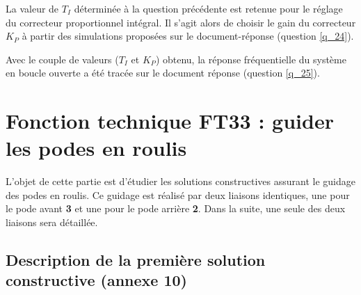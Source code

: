 \ifprof
\begin{corrige}
\end{corrige}
\else
\fi


La valeur de $T_I$ déterminée à la question précédente est retenue pour le réglage du correcteur proportionnel intégral. Il s’agit alors de choisir le gain du correcteur $K_P$ à partir des simulations proposées sur le document-réponse (question \ref{q_24}).

\ifprof
\begin{corrige}
\end{corrige}
\else
\fi


Avec le couple de valeurs ($T_I$ et $K_P$) obtenu, la réponse fréquentielle du système en boucle ouverte a été tracée sur le document réponse (question \ref{q_25}).

\ifprof
\begin{corrige}
\end{corrige}
\else
\fi


\section{Fonction technique FT33 : guider les podes en roulis}

L’objet de cette partie est d’étudier les solutions constructives assurant le guidage des podes en roulis. Ce guidage est réalisé par deux liaisons identiques, une pour le pode avant \textbf{3} et une pour le pode arrière \textbf{2}. Dans la suite, une seule des deux liaisons sera détaillée.

\subsection{Description de la première solution constructive (annexe 10)}

